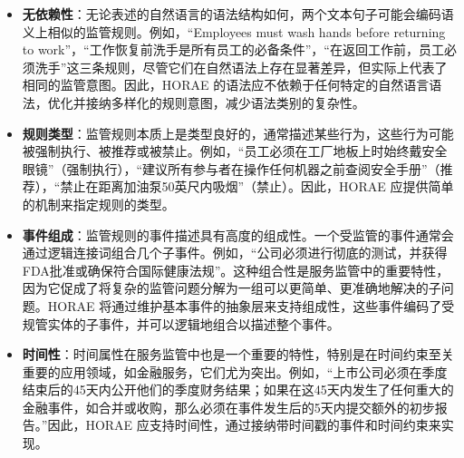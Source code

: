 \begin{itemize}
    \item \textbf{无依赖性}：无论表述的自然语言的语法结构如何，两个文本句子可能会编码语义上相似的监管规则。例如，“Employees must wash hands before returning to work”，“工作恢复前洗手是所有员工的必备条件”，“在返回工作前，员工必须洗手”这三条规则，尽管它们在自然语法上存在显著差异，但实际上代表了相同的监管意图。因此，HORAE 的语法应不依赖于任何特定的自然语言语法，优化并接纳多样化的规则意图，减少语法类别的复杂性。
    \item \textbf{规则类型}：监管规则本质上是类型良好的，通常描述某些行为，这些行为可能被强制执行、被推荐或被禁止。例如，“员工必须在工厂地板上时始终戴安全眼镜”（强制执行），“建议所有参与者在操作任何机器之前查阅安全手册”（推荐），“禁止在距离加油泵50英尺内吸烟”（禁止）。因此，HORAE 应提供简单的机制来指定规则的类型。
    \item \textbf{事件组成}：监管规则的事件描述具有高度的组成性。一个受监管的事件通常会通过逻辑连接词组合几个子事件。例如，“公司必须进行彻底的测试，并获得FDA批准或确保符合国际健康法规”。这种组合性是服务监管中的重要特性，因为它促成了将复杂的监管问题分解为一组可以更简单、更准确地解决的子问题。HORAE 将通过维护基本事件的抽象层来支持组成性，这些事件编码了受规管实体的子事件，并可以逻辑地组合以描述整个事件。
    \item \textbf{时间性}：时间属性在服务监管中也是一个重要的特性，特别是在时间约束至关重要的应用领域，如金融服务，它们尤为突出。例如，“上市公司必须在季度结束后的45天内公开他们的季度财务结果；如果在这45天内发生了任何重大的金融事件，如合并或收购，那么必须在事件发生后的5天内提交额外的初步报告。”因此，HORAE 应支持时间性，通过接纳带时间戳的事件和时间约束来实现。
\end{itemize}

